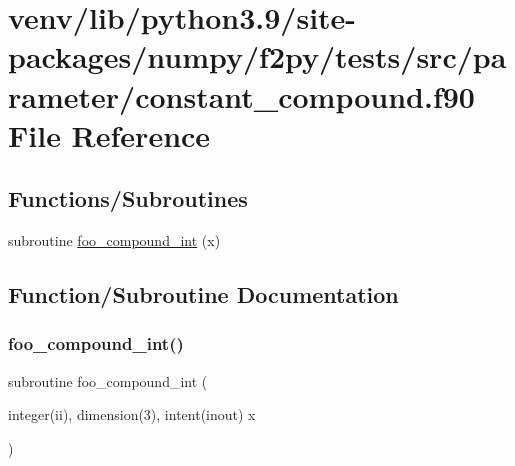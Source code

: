 \hypertarget{constant__compound_8f90}{}\section{venv/lib/python3.9/site-\/packages/numpy/f2py/tests/src/parameter/constant\+\_\+compound.f90 File Reference}
\label{constant__compound_8f90}
\subsection*{Functions/\+Subroutines}
\begin{DoxyCompactItemize}
\item 
subroutine \hyperlink{constant__compound_8f90_a5e7f8c17201156d892c662a5653616b9}{foo\+\_\+compound\+\_\+int} (x)
\end{DoxyCompactItemize}


\subsection{Function/\+Subroutine Documentation}
\mbox{\label{constant__compound_8f90_a5e7f8c17201156d892c662a5653616b9}} 
\subsubsection{\texorpdfstring{foo\+\_\+compound\+\_\+int()}{foo\_compound\_int()}}
{\footnotesize\ttfamily subroutine foo\+\_\+compound\+\_\+int (\begin{DoxyParamCaption}\item[{integer(ii), dimension(3), intent(inout)}]{x }\end{DoxyParamCaption})}

